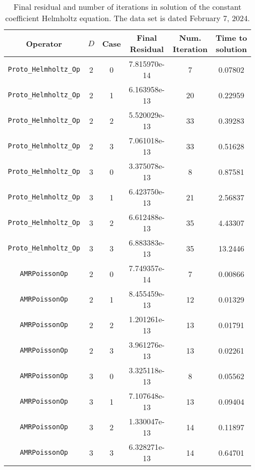\documentclass{article}
\begin{document}
\begin{small}
\begin{table}
\begin{center}
\begin{tabular}{|c|c|c|c|c||c|} \hline
 Operator                   & $D$ & Case & Final Residual &
 Num. Iteration & Time to solution\\
\hline
 {\tt Proto\_Helmholtz\_Op}       & 2   & 0    & 7.815970e-14   & 7   & 0.07802\\
 {\tt Proto\_Helmholtz\_Op}       & 2   & 1    & 6.163958e-13   & 20  & 0.22959\\
 {\tt Proto\_Helmholtz\_Op}       & 2   & 2    & 5.520029e-13   & 33  & 0.39283\\
 {\tt Proto\_Helmholtz\_Op}       & 2   & 3    & 7.061018e-13   & 33  & 0.51628\\
 {\tt Proto\_Helmholtz\_Op}       & 3   & 0    & 3.375078e-13   & 8   & 0.87581\\
 {\tt Proto\_Helmholtz\_Op}       & 3   & 1    & 6.423750e-13   & 21  & 2.56837\\
 {\tt Proto\_Helmholtz\_Op}       & 3   & 2    & 6.612488e-13   & 35  & 4.43307\\
 {\tt Proto\_Helmholtz\_Op}       & 3   & 3    & 6.883383e-13   & 35  & 13.2446\\
 \hline                                                   
 {\tt AMRPoissonOp}               & 2   & 0    & 7.749357e-14   &  7  & 0.00866\\
 {\tt AMRPoissonOp}               & 2   & 1    & 8.455459e-13   &  12 & 0.01329\\
 {\tt AMRPoissonOp}               & 2   & 2    & 1.201261e-13   &  13 & 0.01791\\
 {\tt AMRPoissonOp}               & 2   & 3    & 3.961276e-13   &  13 & 0.02261\\
 {\tt AMRPoissonOp}               & 3   & 0    & 3.325118e-13   &  8  & 0.05562\\
 {\tt AMRPoissonOp}               & 3   & 1    & 7.107648e-13   &  13 & 0.09404\\
 {\tt AMRPoissonOp}               & 3   & 2    & 1.330047e-13   &  14 & 0.11897\\
 {\tt AMRPoissonOp}               & 3   & 3    & 6.328271e-13   &  14 & 0.64701\\
\hline
\end{tabular}
\end{center}
\label{tab::helmholtz}
\caption
    {
      Final residual and number of iterations in solution of the  constant
      coefficient Helmholtz equation.
      The data set is dated February 7, 2024.
    }
\end{table}
\end{small}
\end{document}
